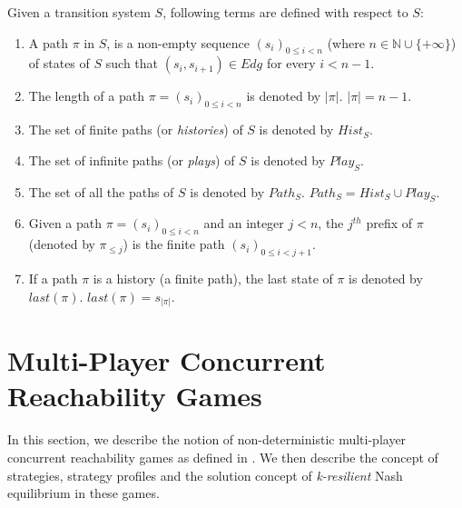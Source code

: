 Given a transition system $S$, following terms are defined with respect to $S$:
\begin{enumerate}
\item A path $\pi$ in $S$, is a non-empty sequence $(s_{i})_{0\leq i<n}$ (where $n \in \mathbb{N} \cup \lbrace +\infty \rbrace$) of states of $S$ such that $(s_{i}, s_{i+1}) \in Edg$ for every $i < n-1$.
\item The length of a path $\pi = (s_{i})_{0\leq i<n}$ is denoted by $\vert \pi \vert$. $\vert \pi \vert = n-1$.
\item The set of finite paths (or \textit{histories}) of $S$ is denoted by $Hist_{S}$.
\item The set of infinite paths (or \textit{plays}) of $S$ is denoted by $Play_{S}$.
\item The set of all the paths of $S$ is denoted by $Path_{S}$. $Path_{S} = Hist_{S} \cup Play_{S}$.
\item Given a path $\pi = (s_{i})_{0\leq i<n}$ and an integer $j < n$, the $j^{th}$ prefix of $\pi$ (denoted by $\pi_{\leq j}$) is the finite path $(s_{i})_{0\leq i<j+1}$.
\item If a path $\pi$ is a history (a finite path), the last state of $\pi$ is denoted by $last(\pi)$. $last(\pi) = s_{\vert \pi \vert}$.    
\end{enumerate}

\section{Multi-Player Concurrent Reachability Games}

In this section, we describe the notion of non-deterministic multi-player concurrent reachability games as defined in \cite{BBM-concur10,BBM-report}. We then describe the concept of strategies, strategy profiles and the solution concept of \textit{k-resilient} Nash equilibrium in these games.

